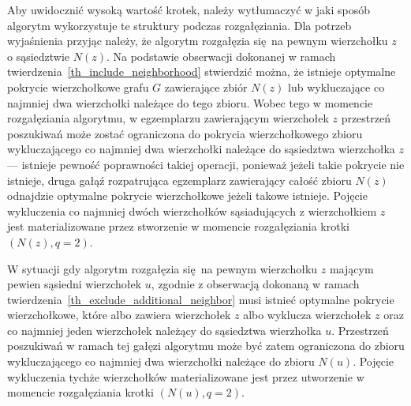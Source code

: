 \par{
  Aby uwidocznić wysoką wartość krotek, należy wytłumaczyć w jaki sposób algorytm wykorzystuje te struktury podczas rozgałęziania.
  Dla potrzeb wyjaśnienia przyjąc należy, że algorytm rozgałęzia się na pewnym wierzchołku $z$ o sąsiedztwie $N(z)$.
  Na podstawie obserwacji dokonanej w ramach twierdzenia~\ref{th_include_neighborhood} stwierdzić można, że istnieje optymalne pokrycie wierzchołkowe grafu $G$ zawierające zbiór $N(z)$ lub wykluczające co najmniej dwa wierzchołki należące do tego zbioru.
  Wobec tego w momencie rozgałęziania algorytmu, w egzemplarzu zawierającym wierzchołek $z$ przestrzeń poszukiwań może zostać ograniczona do pokrycia wierzchołkowego zbioru wykluczającego co najmniej dwa wierzchołki należące do sąsiedztwa wierzchołka $z$ --- istnieje pewność poprawności takiej operacji, ponieważ jeżeli takie pokrycie nie istnieje, druga gałąź rozpatrująca egzemplarz zawierający całość zbioru $N(z)$ odnajdzie optymalne pokrycie wierzchołkowe jeżeli takowe istnieje.
  Pojęcie wykluczenia co najmniej dwóch wierzchołków sąsiadujących z wierzchołkiem $z$ jest materializowane przez stworzenie w momencie rozgałęziania krotki $(N(z), q=2)$.

  W sytuacji gdy algorytm rozgałęzia się na pewnym wierzchołku $z$ mającym pewien sąsiedni wierzchołek $u$, zgodnie z obserwacją dokonaną w ramach twierdzenia~\ref{th_exclude_additional_neighbor} musi istnieć optymalne pokrycie wierzchołkowe, które albo zawiera wierzchołek $z$ albo wyklucza wierzchołek $z$ oraz co najmniej jeden wierzchołek należący do sąsiedztwa wierzhołka $u$.
  Przestrzeń poszukiwań w ramach tej gałęzi algorytmu może być zatem ograniczona do zbioru wykluczającego co najmniej dwa wierzchołki należące do zbioru $N(u)$.
  Pojęcie wykluczenia tychże wierzchołków materializowane jest przez utworzenie w momencie rozgałęziania krotki $(N(u), q=2)$.
}
